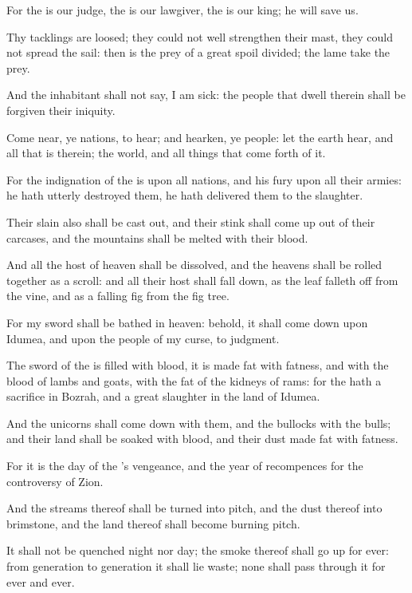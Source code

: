 \Verse For the \LORD is our judge, the \LORD is our lawgiver, the \LORD is our king; he will save us.

\Verse Thy tacklings are loosed; they could not well strengthen their mast, they could not spread the sail: then is the prey of a great spoil divided; the lame take the prey.

\Verse And the inhabitant shall not say, I am sick: the people that dwell therein shall be forgiven their iniquity.


\Chapter
\Verse Come near, ye nations, to hear; and hearken, ye people: let the earth hear, and all that is therein; the world, and all things that come forth of it.

\Verse For the indignation of the \LORD is upon all nations, and his fury upon all their armies: he hath utterly destroyed them, he hath delivered them to the slaughter.

\Verse Their slain also shall be cast out, and their stink shall come up out of their carcases, and the mountains shall be melted with their blood.

\Verse And all the host of heaven shall be dissolved, and the heavens shall be rolled together as a scroll: and all their host shall fall down, as the leaf falleth off from the vine, and as a falling fig from the fig tree.

\Verse For my sword shall be bathed in heaven: behold, it shall come down upon Idumea, and upon the people of my curse, to judgment.

\Verse The sword of the \LORD is filled with blood, it is made fat with fatness, and with the blood of lambs and goats, with the fat of the kidneys of rams: for the \LORD hath a sacrifice in Bozrah, and a great slaughter in the land of Idumea.

\Verse And the unicorns shall come down with them, and the bullocks with the bulls; and their land shall be soaked with blood, and their dust made fat with fatness.

\Verse For it is the day of the \LORD's vengeance, and the year of recompences for the controversy of Zion.

\Verse And the streams thereof shall be turned into pitch, and the dust thereof into brimstone, and the land thereof shall become burning pitch.

\Verse It shall not be quenched night nor day; the smoke thereof shall go up for ever: from generation to generation it shall lie waste; none shall pass through it for ever and ever.

